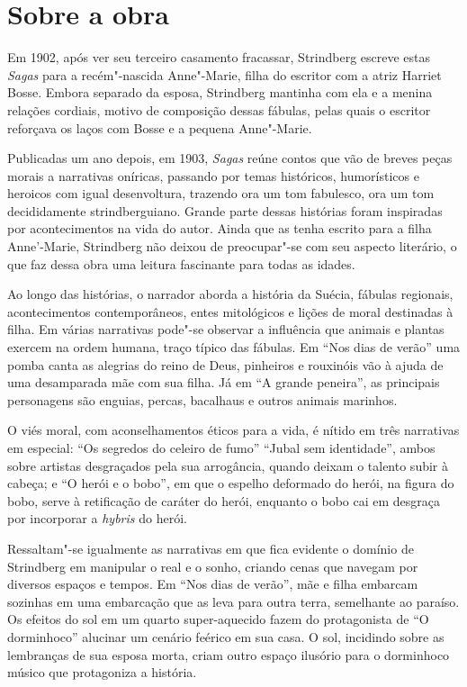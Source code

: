 \section{Sobre a obra}

Em 1902, após ver seu terceiro casamento fracassar, Strindberg escreve estas \textit{Sagas} para a recém"-nascida Anne"-Marie, filha do escritor com a atriz Harriet Bosse. Embora separado da esposa, Strindberg mantinha com ela e a menina relações
cordiais, motivo de composição dessas fábulas, pelas quais o escritor reforçava os laços com Bosse e a pequena Anne"-Marie.

Publicadas um ano depois, em 1903, \textit{Sagas} reúne contos que vão de breves peças morais a narrativas oníricas, passando por temas históricos, humorísticos e heroicos com igual desenvoltura, trazendo ora um tom fabulesco, ora um tom decididamente strindberguiano. Grande parte dessas histórias 
foram inspiradas por acontecimentos na vida do autor. Ainda que as tenha escrito para a filha Anne'-Marie, Strindberg não deixou de preocupar"-se com seu aspecto literário, o que faz dessa obra uma leitura fascinante para todas as idades.

Ao longo das histórias, o narrador aborda a história da Suécia, fábulas regionais, acontecimentos contemporâneos, entes mitológicos e lições de moral destinadas à filha. Em várias narrativas pode"-se observar a influência que animais e plantas exercem na ordem humana, traço típico das fábulas. Em ``Nos dias de verão'' uma pomba canta as alegrias do reino de Deus, pinheiros e rouxinóis vão à ajuda de uma desamparada mãe com sua filha. Já em ``A grande peneira'', as principais personagens são enguias, percas, bacalhaus e outros animais marinhos. 

O viés moral, com aconselhamentos éticos para a vida, é nítido em três narrativas em especial: ``Os segredos do celeiro de fumo'' ``Jubal sem identidade'', ambos sobre artistas desgraçados pela sua arrogância, quando deixam o talento subir à cabeça; e ``O herói e o bobo'', em que o espelho deformado do herói, na figura do bobo, serve à retificação de caráter do herói, enquanto o bobo cai em desgraça por incorporar a \emph{hybris} do herói.

Ressaltam"-se igualmente as narrativas em que fica evidente o domínio de Strindberg em manipular o real e o sonho, criando cenas que navegam por diversos espaços e tempos. Em ``Nos dias de verão'', mãe e filha embarcam sozinhas em uma embarcação que as leva para outra terra, semelhante ao paraíso. Os efeitos do sol em um quarto super-aquecido fazem do protagonista de ``O dorminhoco'' alucinar um cenário feérico em sua casa. O sol, incidindo sobre as lembranças de sua esposa morta, criam outro espaço ilusório para o dorminhoco músico que protagoniza a história.

